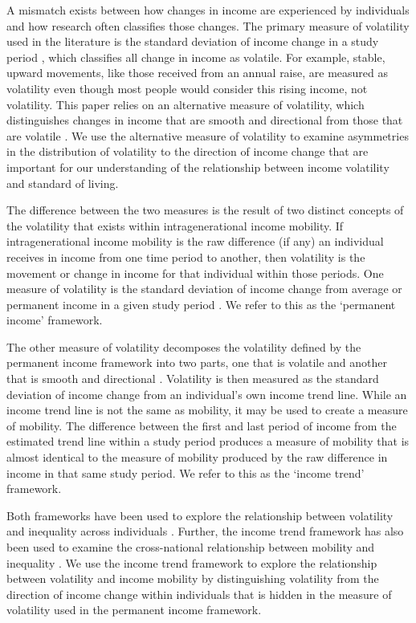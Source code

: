 \documentclass[12pt]{article}
\begin{document}
A mismatch exists between how changes in income are experienced by individuals and how research often classifies those changes. The primary measure of volatility used in the literature is the standard deviation of income change in a study period \citep{jenkins_2011}, which classifies all change in income as volatile. For example, stable, upward movements, like those received from an annual raise, are measured as volatility even though most people would consider this rising income, not volatility. This paper relies on an alternative measure of volatility, which distinguishes changes in income that are smooth and directional from those that are volatile \citep{gangl_2005}. We use the alternative measure of volatility to examine asymmetries in the distribution of volatility to the direction of income change that are important for our understanding of the relationship between income volatility and standard of living. 

The difference between the two measures is the result of two distinct concepts of the volatility that exists within intragenerational income mobility. If intragenerational income mobility is the raw difference (if any) an individual receives in income from one time period to another, then volatility is the movement or change in income for that individual within those periods. One measure of volatility is the standard deviation of income change from average or permanent income in a given study period \citep{gottschalk_moffitt_1994}. We refer to this as the `permanent income' framework.

The other measure of volatility decomposes the volatility defined by the permanent income framework into two parts, one that is volatile and another that is smooth and directional \citep{gangl_2005}. Volatility is then measured as the standard deviation of income change from an individual's own income trend line. While an income trend line is not the same as mobility, it may be used to create a measure of mobility. The difference between the first and last period of income from the estimated trend line within a study period produces a measure of mobility that is almost identical to the measure of mobility produced by the raw difference in income in that same study period. We refer to this as the `income trend' framework.

Both frameworks have been used to explore the relationship between volatility and inequality across individuals \citep{gottschalk_moffitt_1994,gangl_2005}. Further, the income trend framework has also been used to examine the cross-national relationship between mobility and inequality \citep{gangl_2005}. We use the income trend framework to explore the relationship between volatility and income mobility by distinguishing volatility from the direction of income change within individuals that is hidden in the measure of volatility used in the permanent income framework. 
\end{document}
